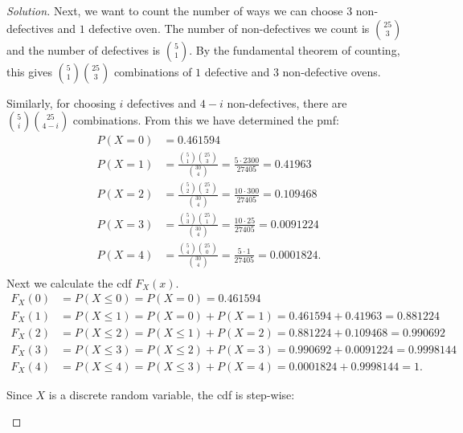 \documentclass[12pt]{article}
\theoremstyle{definition}
\theoremstyle{plain}
\newenvironment{solution}
  {\begin{proof}[Solution]}
  {\end{proof}}
\begin{document}
\begin{enumerate}
\begin{solution}
Next, we want to count the number of ways we can choose $ 3 $ non-defectives and $ 1 $ defective oven. The number of non-defectives we count is $ \binom{25}{3} $ and the number of defectives is $ \binom{5}{1} $. By the fundamental theorem of counting, this gives $ \binom{5}{1}  \binom{25}{3}$ combinations of $ 1$ defective and $ 3 $ non-defective ovens.

Similarly, for choosing $ i $ defectives and $ 4 - i $ non-defectives, there are $ \binom{5}{i} \binom{25}{4 - i} $ combinations. From this we have determined the pmf:
\begin{align*}
	P(X = 0) &= 0.461594 \\
	P(X = 1) &= \frac{\binom{5}{1} \binom{25}{3}}{ \binom{30}{4}} = \frac{5 \cdot 2300}{27405} = 0.41963\\
	P(X = 2) &= \frac{\binom{5}{2} \binom{25}{2}}{ \binom{30}{4}} = \frac{10 \cdot 300}{27405} = 0.109468 \\
	P(X = 3) &= \frac{\binom{5}{3} \binom{25}{1}}{ \binom{30}{4}} = \frac{10 \cdot 25}{27405} = 0.0091224 \\
	P(X = 4) &= \frac{\binom{5}{4} \binom{25}{0}}{ \binom{30}{4}} = \frac{5 \cdot 1  }{27405} = 0.0001824 .\\
\end{align*}
Next we calculate the cdf $F_X(x) $.
\begin{align*}
	F_X(0) &= P(X \leq 0) = P(X = 0) = 0.461594\\
	F_X(1) &= P(X \leq 1) = P(X = 0) + P(X = 1) = 0.461594 + 0.41963 = 0.881224\\
	F_X(2) &= P(X \leq 2) = P(X \leq 1) + P(X = 2) = 0.881224 + 0.109468 = 0.990692\\
	F_X(3) &= P(X \leq 3) = P(X \leq 2) + P(X = 3) = 0.990692 + 0.0091224 = 0.9998144\\
	F_X(4) &= P(X \leq 4) = P(X \leq 3) + P(X = 4) = 0.0001824 + 0.9998144 = 1.
\end{align*}

Since $ X $ is a discrete random variable, the cdf is step-wise:


\begin{center}
\end{center}
\end{solution}


\end{enumerate}
\end{document}
